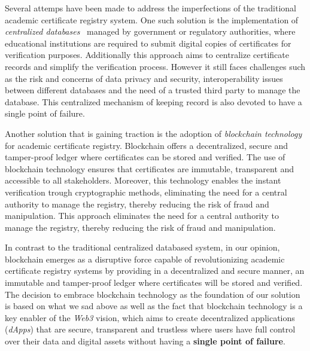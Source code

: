 Several attemps have been made to address the imperfections of the traditional academic certificate registry system.
One such solution is the implementation of \textit{centralized databases}~\cite{OLSON200971} managed by government or regulatory authorities, where educational institutions are required to
submit digital copies of certificates for verification purposes. Additionally this approach aims to centralize certificate records and simplify the verification process. However it still faces challenges
such as the risk and concerns of data privacy and security, interoperability issues between different databases and the need of a trusted third party to manage the database.
This centralized mechanism of keeping record is also devoted to have a single point of failure.

Another solution that is gaining traction is the adoption of \textit{blockchain technology} for academic certificate registry. Blockchain offers a decentralized, secure and tamper-proof ledger where certificates can be stored and verified.
The use of blockchain technology ensures that certificates are immutable, transparent and accessible to all stakeholders. Moreover, this technology enables the instant verification trough cryptographic methods,
eliminating the need for a central authority to manage the registry, thereby reducing the risk of fraud and manipulation.
This approach eliminates the need for a central authority to manage the registry, thereby reducing the risk of fraud and manipulation.

In contrast to the traditional centralized databased system, in our opinion, blockchain emerges as a disruptive force capable of revolutionizing academic certificate registry systems
by providing in a decentralized and secure manner, an immutable and tamper-proof ledger where certificates will be stored and verified.
The decision to embrace blockchain technology as the foundation of our solution is based on what we sad above as well as the fact that blockchain technology is a key enabler of the \textit{Web3} vision,
which aims to create decentralized applications (\textit{dApps}) that are secure, transparent and trustless where users have full control over their data and digital assets without having a \textbf{single point of failure}.

\pagebreak %

